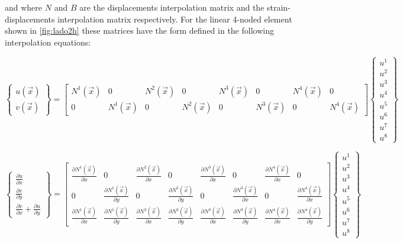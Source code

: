 and where $N$ and $B$ are the displacements interpolation matrix and the strain-displacements interpolation matrix respectively. For the linear 4-noded element shown in \cref{fig:lado2h} these matrices have the form defined in the following interpolation equations:


\[\left\{ {\begin{array}{*{20}{c}}
{u(\vec x)}\\
{v(\vec x)}
\end{array}} \right\} = \left[ {\begin{array}{*{20}{c}}
{{N^1}(\vec x)}&0&{{N^2}(\vec x)}&0&{{N^3}(\vec x)}&0&{{N^4}(\vec x)}&0\\
0&{{N^1}(\vec x)}&0&{{N^2}(\vec x)}&0&{{N^3}(\vec x)}&0&{{N^4}(\vec x)}
\end{array}} \right]\left\{ {\begin{array}{*{20}{c}}
{{u^1}}\\
{{u^2}}\\
{{u^3}}\\
{{u^4}}\\
{{u^5}}\\
{{u^6}}\\
{{u^7}}\\
{{u^8}}
\end{array}} \right\}\]


\[\left\{ {\begin{array}{*{20}{c}}
{\frac{{\partial u}}{{\partial x}}}\\
{\frac{{\partial v}}{{\partial y}}}\\
{\frac{{\partial v}}{{\partial x}} + \frac{{\partial u}}{{\partial y}}}
\end{array}} \right\} = \left[ {\begin{array}{*{20}{c}}
{\frac{{\partial {N^1}(\vec x)}}{{\partial x}}}&0&{\frac{{\partial {N^2}(\vec x)}}{{\partial x}}}&0&{\frac{{\partial {N^3}(\vec x)}}{{\partial x}}}&0&{\frac{{\partial {N^4}(\vec x)}}{{\partial x}}}&0\\
0&{\frac{{\partial {N^1}(\vec x)}}{{\partial y}}}&0&{\frac{{\partial {N^2}(\vec x)}}{{\partial y}}}&0&{\frac{{\partial {N^3}(\vec x)}}{{\partial x}}}&0&{\frac{{\partial {N^4}(\vec x)}}{{\partial x}}}\\
{\frac{{\partial {N^1}(\vec x)}}{{\partial x}}}&{\frac{{\partial {N^1}(\vec x)}}{{\partial y}}}&{\frac{{\partial {N^2}(\vec x)}}{{\partial x}}}&{\frac{{\partial {N^2}(\vec x)}}{{\partial y}}}&{\frac{{\partial {N^3}(\vec x)}}{{\partial x}}}&{\frac{{\partial {N^3}(\vec x)}}{{\partial y}}}&{\frac{{\partial {N^4}(\vec x)}}{{\partial x}}}&{\frac{{\partial {N^4}(\vec x)}}{{\partial y}}}
\end{array}} \right]\left\{ {\begin{array}{*{20}{c}}
{{u^1}}\\
{{u^2}}\\
{{u^3}}\\
{{u^4}}\\
{{u^5}}\\
{{u^6}}\\
{{u^7}}\\
{{u^8}}
\end{array}} \right\}\]

